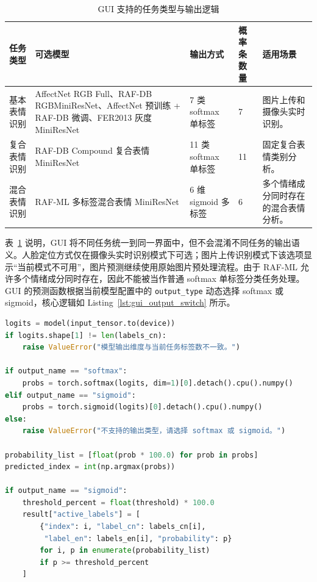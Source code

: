 \documentclass[UTF8,a4paper,12pt]{ctexart}
\newcommand{\code}[1]{\texttt{#1}}
\begin{document}
\begin{table}[H]
  \centering
  \caption{GUI 支持的任务类型与输出逻辑}
  \label{tab:gui_task_logic}
  \scriptsize
  \setlength{\tabcolsep}{3pt}
  \renewcommand{\arraystretch}{1.18}
  \begin{tabularx}{\textwidth}{p{}p{}p{}p{}X}
    \toprule
    任务类型 & 可选模型 & 输出方式 & 概率条数量 & 适用场景 \\
    \midrule
    基本表情识别 & AffectNet RGB Full、RAF-DB RGBMiniResNet、AffectNet 预训练 + RAF-DB 微调、FER2013 灰度 MiniResNet & 7 类 softmax 单标签 & 7 & 图片上传和摄像头实时识别。\\
    复合表情识别 & RAF-DB Compound 复合表情 MiniResNet & 11 类 softmax 单标签 & 11 & 固定复合表情类别分析。\\
    混合表情识别 & RAF-ML 多标签混合表情 MiniResNet & 6 维 sigmoid 多标签 & 6 & 多个情绪成分同时存在的混合表情分析。\\
    \bottomrule
  \end{tabularx}
\end{table}

表~\ref{tab:gui_task_logic} 说明，GUI 将不同任务统一到同一界面中，但不会混淆不同任务的输出语义。人脸定位方式仅在摄像头实时识别模式下可选；图片上传识别模式下该选项显示“当前模式不可用”，图片预测继续使用原始图片预处理流程。由于 RAF-ML 允许多个情绪成分同时存在，因此不能被当作普通 softmax 单标签分类任务处理。GUI 的预测函数根据当前模型配置中的 \code{output\_type} 动态选择 softmax 或 sigmoid，核心逻辑如 Listing~\ref{lst:gui_output_switch} 所示。

\begin{lstlisting}[language=Python, caption={GUI 预测中 softmax / sigmoid 动态切换核心逻辑}, label={lst:gui_output_switch}]
logits = model(input_tensor.to(device))
if logits.shape[1] != len(labels_cn):
    raise ValueError("模型输出维度与当前任务标签数不一致。")

if output_name == "softmax":
    probs = torch.softmax(logits, dim=1)[0].detach().cpu().numpy()
elif output_name == "sigmoid":
    probs = torch.sigmoid(logits)[0].detach().cpu().numpy()
else:
    raise ValueError("不支持的输出类型，请选择 softmax 或 sigmoid。")

probability_list = [float(prob * 100.0) for prob in probs]
predicted_index = int(np.argmax(probs))

if output_name == "sigmoid":
    threshold_percent = float(threshold) * 100.0
    result["active_labels"] = [
        {"index": i, "label_cn": labels_cn[i],
         "label_en": labels_en[i], "probability": p}
        for i, p in enumerate(probability_list)
        if p >= threshold_percent
    ]
\end{lstlisting}
\end{document}
